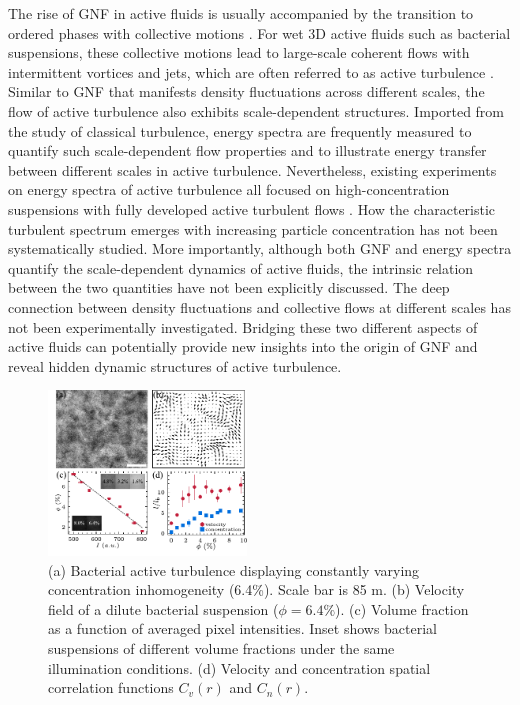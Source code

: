 \documentclass[twocolumn,aps,prl,amsmath,amssymb,longbibliography]{revtex4-2}
\begin{document}
The rise of GNF in active fluids is usually accompanied by the transition to ordered phases with collective motions \cite{Ramaswamy2010,Marchetti2013}. For wet 3D active fluids such as bacterial suspensions, these collective motions lead to large-scale coherent flows with intermittent vortices and jets, which are often referred to as active turbulence \cite{Wolgemuth2008,Wensink2012,Dunkel2013a,Bratanov2015,Guo2018,Linkmann2019,Bardfalvy2019,Alert2020,Skultety2020,Peng2020}. Similar to GNF that manifests density fluctuations across different scales, the flow of active turbulence also exhibits scale-dependent structures. Imported from the study of classical turbulence, energy spectra are frequently measured to quantify such scale-dependent flow properties and to illustrate energy transfer between different scales in active turbulence. Nevertheless, existing experiments on energy spectra of active turbulence all focused on high-concentration suspensions with fully developed active turbulent flows \cite{Ishikawa2011,Wensink2012,Dunkel2013a,Creppy2015,Patteson2018}. How the characteristic turbulent spectrum emerges with increasing particle concentration has not been systematically studied. More importantly, although both GNF and energy spectra quantify the scale-dependent dynamics of active fluids, the intrinsic relation between the two quantities have not been explicitly discussed. The deep connection between density fluctuations and collective flows at different scales has not been experimentally investigated. Bridging these two different aspects of active fluids can potentially provide new insights into the origin of GNF and reveal hidden dynamic structures of active turbulence.

\begin{figure}[ht]
\begin{center}
\includegraphics[width=0.47\textwidth]{Figures/experiment/v1.pdf}
\caption[Experimental details]
{
(a) Bacterial active turbulence displaying constantly varying concentration inhomogeneity (6.4\%). Scale bar is 85 \textmu m.
(b) Velocity field of a dilute bacterial suspension ($\phi=6.4\%$).
(c) Volume fraction as a function of averaged pixel intensities. Inset shows bacterial suspensions of different volume fractions under the same illumination conditions.
(d) Velocity and concentration spatial correlation functions $C_{v}(r)$ and $C_{n}(r)$.
}
\label{fig:experiment}
\end{center}
\end{figure}
\end{document}
